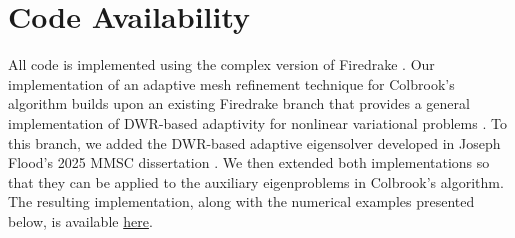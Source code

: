 




\section{Code Availability}



All code is implemented using the complex version of Firedrake \cite{Firedrake}.
Our implementation of an adaptive mesh refinement technique for Colbrook's algorithm builds upon an existing Firedrake branch that provides a general implementation of DWR-based adaptivity for nonlinear variational problems \cite{pablo}. To this branch, we added the DWR-based adaptive eigensolver developed in Joseph Flood's 2025 MMSC dissertation \cite{joe}. We then extended both implementations so that they can be applied to the auxiliary eigenproblems in Colbrook's algorithm. The resulting implementation, along with the numerical examples presented below, is available \href{https://github.com/maggiemcc02/firedrake/tree/mmsc-dissertation-2026/mmsc_dissertation}
{here}.

